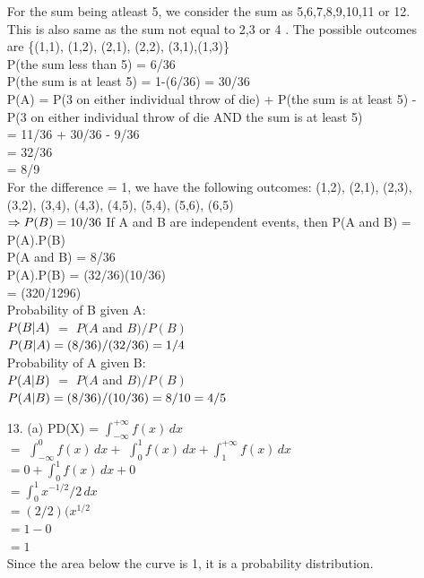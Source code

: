 \documentclass[12pt]{article}
\begin{document}
\begin{enumerate}
For the sum being atleast 5, we consider the sum as 5,6,7,8,9,10,11 or 12. This is also same as the sum not equal to 2,3 or 4 . The possible outcomes are \{(1,1), (1,2), (2,1), (2,2), (3,1),(1,3)\} \\

P(the sum less than 5) = 6/36 \\
P(the sum is at least 5) = 1-(6/36) = 30/36 \\

P(A) = P(3 on either individual throw of die) + P(the sum is at least 5) - P(3 on either individual throw of die AND the sum is at least 5) \\
= 11/36 + 30/36 - 9/36 \\
= 32/36 \\
= 8/9 \\

For the difference = 1, we have the following outcomes: {(1,2), (2,1), (2,3), (3,2), (3,4), (4,3), (4,5), (5,4), (5,6), (6,5)}
\\
$\Rightarrow P(B) = 10/36 \\$
If A and B are independent events, then P(A and B) = P(A).P(B) \\
P(A and B) = 8/36 \\
P(A).P(B) = (32/36)(10/36) \\
= (320/1296) \\

Probability of B given A: \\

$P(B \arrowvert A)$ $=$ $P(A $ and $B)/P(B)$ \\
$P(B \arrowvert A) = (8/36)/(32/36) = 1/4$ \\ 

Probability of A given B: \\

$P(A \arrowvert B)$ $=$ $P(A $ and $B)/P(B)$ \\
$P(A \arrowvert B) = (8/36)/(10/36) = 8/10 = 4/5$ \\

\item[13.] (a) PD(X) = $ \int^{+\infty}_{-\infty} f(x) \, dx $ \\
$=$ $ \int^{0}_{-\infty} f(x) \, dx + $
$ \int^{1}_{0} f(x) \, dx +  \int^{+\infty}_{1} f(x) \, dx $ \\
$ = 0 +  \int^{1}_{0} f(x) \, dx + 0 $ \\
$ = \int^{1}_{0} x^ {-1/2}/2  \, dx $ \\
$= (2/2)(x^{1/2}$ \\
$= 1-0$ \\
$= 1$ \\
Since the area below the curve is 1, it is a probability distribution. \\


\end{enumerate}
\end{document}
